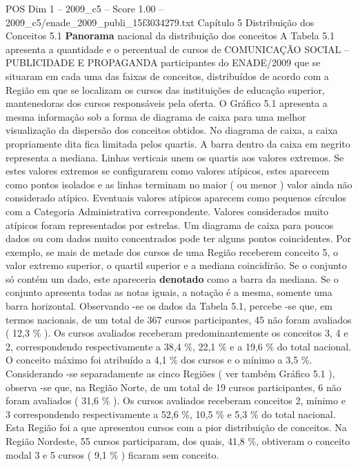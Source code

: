 \begin{textsample}{POS Dim 1 – 2009\_c5 – Score 1.00 – 2009\_c5/enade\_2009\_publi\_15f3034279.txt}  \label{ex:f1_pos_143}
Capítulo 5 Distribuição dos Conceitos 5.1 \textbf{Panorama} nacional da distribuição dos conceitos A Tabela 5.1 apresenta a quantidade e o percentual de cursos de COMUNICAÇÃO SOCIAL – PUBLICIDADE E PROPAGANDA participantes do ENADE/2009 que se situaram em cada uma das faixas de conceitos, distribuídos de acordo com a Região em que se localizam os cursos das instituições de educação superior, mantenedoras dos cursos responsáveis pela oferta.
O Gráfico 5.1 apresenta a mesma informação sob a forma de diagrama de caixa para uma melhor visualização da dispersão dos conceitos obtidos.
No diagrama de caixa, a caixa propriamente dita fica limitada pelos quartis.
A barra dentro da caixa em negrito representa a mediana.
Linhas verticais unem os quartis aos valores extremos.
Se estes valores extremos se configurarem como valores atípicos, estes aparecem como pontos isolados e as linhas terminam no maior ( ou menor ) valor ainda não considerado atípico.
Eventuais valores atípicos aparecem como pequenos círculos com a Categoria Administrativa correspondente.
Valores considerados muito atípicos foram representados por estrelas.
Um diagrama de caixa para poucos dados ou com dados muito concentrados pode ter alguns pontos coincidentes.
Por exemplo, se mais de metade dos cursos de uma Região receberem conceito 5, o valor extremo superior, o quartil superior e a mediana coincidirão.
Se o conjunto só contém um dado, este apareceria \textbf{denotado} como a barra da mediana.
Se o conjunto apresenta todas as notas iguais, a notação é a mesma, somente uma barra horizontal.
Observando -se os dados da Tabela 5.1, percebe -se que, em termos nacionais, de um total de 367 cursos participantes, 45 não foram avaliados ( 12,3 \% ).
Os cursos avaliados receberam predominantemente os conceitos 3, 4 e 2, correspondendo respectivamente a 38,4 \%, 22,1 \% e a 19,6 \% do total nacional.
O conceito máximo foi atribuído a 4,1 \% dos cursos e o mínimo a 3,5 \%.
Considerando -se separadamente as cinco Regiões ( ver também Gráfico 5.1 ), observa -se que, na Região Norte, de um total de 19 cursos participantes, 6 não foram avaliados ( 31,6 \% ).
Os cursos avaliados receberam conceitos 2, mínimo e 3 correspondendo respectivamente a 52,6 \%, 10,5 \% e 5,3 \% do total nacional.
Esta Região foi a que apresentou cursos com a pior distribuição de conceitos.
Na Região Nordeste, 55 cursos participaram, dos quais, 41,8 \%, obtiveram o conceito modal 3 e 5 cursos ( 9,1 \% ) ficaram sem conceito.

\end{textsample}
